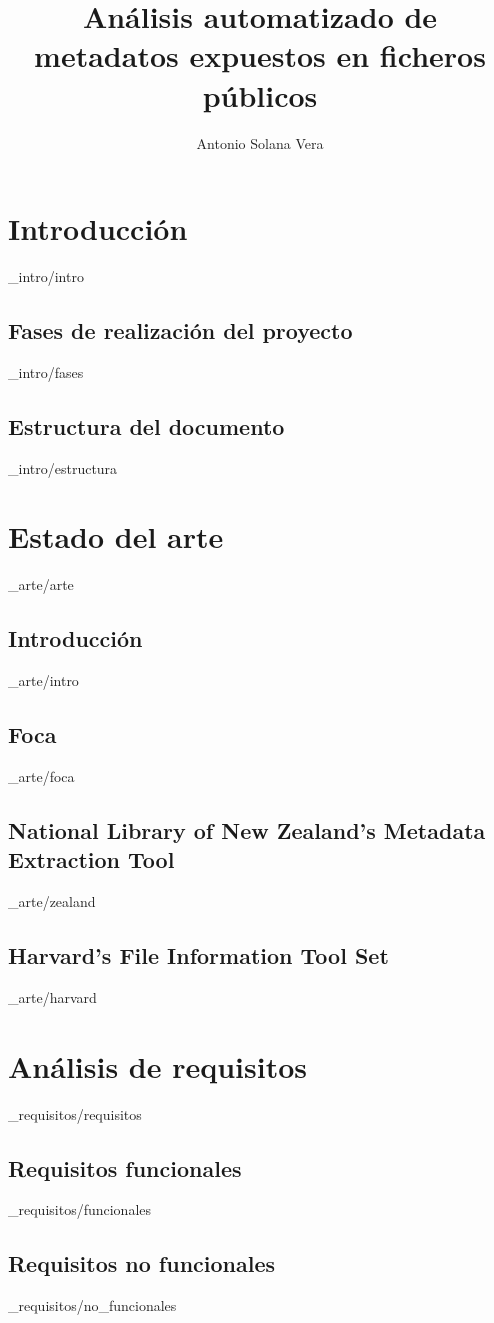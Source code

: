 \documentclass[epsbased,copyright,final,printable,covers,extendedindex,firstnumbered,tfg,gnuplot]{tfgtfmthesisuam}
\title{Análisis automatizado de metadatos expuestos en ficheros públicos}
\author{Antonio Solana Vera}
\begin{document}
\chapter{Introducción\label{CAP:INTRODUCCION}}{_intro/intro}
  \section{Fases de realización del proyecto\label{SEC:FASES}}{_intro/fases}
  \section{Estructura del documento\label{SEC:ESTRUCTURA}}{_intro/estructura}

\chapter{Estado del arte\label{CAP:ARTE}}{_arte/arte}
  \section{Introducción\label{SEC:ARTEINTRO}}{_arte/intro}
  \section{Foca\label{SEC:FOCA}}{_arte/foca}
  \section{National Library of New Zealand's Metadata Extraction Tool\label{SEC:NZMET}}{_arte/zealand}
  \section{Harvard's File Information Tool Set\label{SEC:FITS}}{_arte/harvard}

\chapter{Análisis de requisitos\label{CAP:REQUISITOS}}{_requisitos/requisitos}
  \section{Requisitos funcionales\label{SEC:NOFUNREQUISITOS}}{_requisitos/funcionales}
  \section{Requisitos no funcionales\label{SEC:FUNREQUISITOS}}{_requisitos/no_funcionales}
\end{document}
